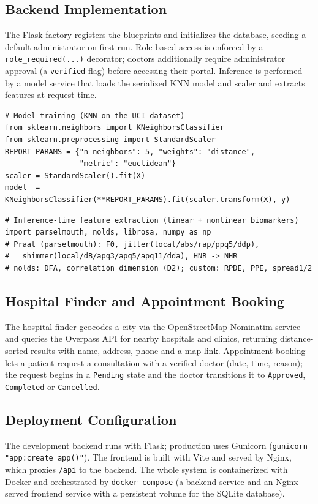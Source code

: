 \documentclass[oneside,a4paper,12pt]{report}
\begin{document}
\subsection{Backend Implementation}
The Flask factory registers the blueprints and initializes the database, seeding a
default administrator on first run. Role-based access is enforced by a
\texttt{role\_required(...)} decorator; doctors additionally require administrator
approval (a \texttt{verified} flag) before accessing their portal. Inference is
performed by a model service that loads the serialized KNN model and scaler and
extracts features at request time.

\begin{verbatim}
# Model training (KNN on the UCI dataset)
from sklearn.neighbors import KNeighborsClassifier
from sklearn.preprocessing import StandardScaler
REPORT_PARAMS = {"n_neighbors": 5, "weights": "distance",
                 "metric": "euclidean"}
scaler = StandardScaler().fit(X)
model  = KNeighborsClassifier(**REPORT_PARAMS).fit(scaler.transform(X), y)
\end{verbatim}

\begin{verbatim}
# Inference-time feature extraction (linear + nonlinear biomarkers)
import parselmouth, nolds, librosa, numpy as np
# Praat (parselmouth): F0, jitter(local/abs/rap/ppq5/ddp),
#   shimmer(local/dB/apq3/apq5/apq11/dda), HNR -> NHR
# nolds: DFA, correlation dimension (D2); custom: RPDE, PPE, spread1/2
\end{verbatim}

\subsection{Hospital Finder and Appointment Booking}
The hospital finder geocodes a city via the OpenStreetMap Nominatim service and
queries the Overpass API for nearby hospitals and clinics, returning
distance-sorted results with name, address, phone and a map link. Appointment
booking lets a patient request a consultation with a verified doctor (date, time,
reason); the request begins in a \texttt{Pending} state and the doctor transitions
it to \texttt{Approved}, \texttt{Completed} or \texttt{Cancelled}.

\subsection{Deployment Configuration}
The development backend runs with Flask; production uses Gunicorn
(\texttt{gunicorn "app:create\_app()"}). The frontend is built with Vite and
served by Nginx, which proxies \texttt{/api} to the backend. The whole system is
containerized with Docker and orchestrated by \texttt{docker-compose} (a backend
service and an Nginx-served frontend service with a persistent volume for the
SQLite database).
\end{document}
